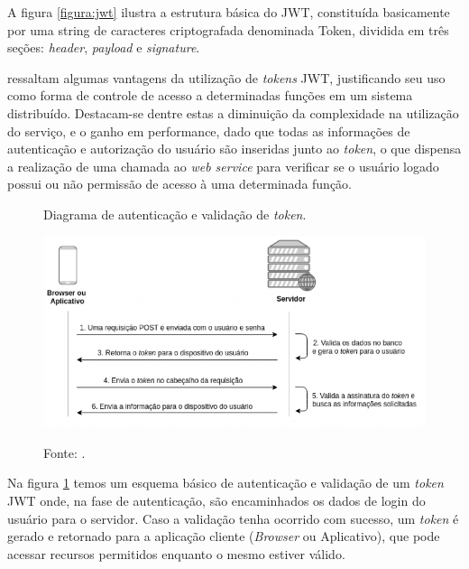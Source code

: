 A figura \ref{figura:jwt} ilustra a estrutura básica do JWT, constituída basicamente por uma string de caracteres criptografada denominada Token, dividida em três seções: \textit{header}, \textit{payload} e \textit{signature}.

 ressaltam algumas vantagens da utilização de \textit{tokens} JWT, justificando seu uso como forma de controle de acesso a determinadas funções em um sistema distribuído. Destacam-se dentre estas a diminuição da complexidade na utilização do serviço, e o ganho em performance, dado que todas as informações de autenticação e autorização do usuário são inseridas junto ao \textit{token}, o que dispensa a realização de uma chamada ao \textit{web service} para verificar se o usuário logado possui ou não permissão de acesso à uma determinada função.

\begin{figure}[h]
	\caption{Diagrama de autenticação e validação de \textit{token}.}
	\caption*{Fonte: .}
	\centering %
	\includegraphics[width=14cm]{resources/jwt-schema.png} %
	\label{figura:jwt-schema}	
\end{figure}

Na figura \ref{figura:jwt-schema} temos um esquema básico de autenticação e validação de um \textit{token} JWT onde, na fase de autenticação, são encaminhados os dados de login do usuário para o servidor. Caso a validação tenha ocorrido com sucesso, um \textit{token} é gerado e retornado para a aplicação cliente (\textit{Browser} ou Aplicativo), que pode acessar recursos permitidos enquanto o mesmo estiver válido.

